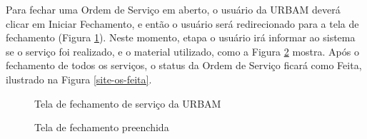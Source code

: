 \documentclass[
	article,			%
	11pt,				%
	oneside,			%
	a4paper,			%
	english,			%
	brazil,				%
	sumario=tradicional
	]{abntex2}
\begin{document}
\clearpage

Para fechar uma Ordem de Serviço em aberto, o usuário da URBAM deverá clicar em Iniciar Fechamento, e então o usuário será redirecionado para a tela de fechamento (Figura \ref{site-fechamento-urbam}).
Neste momento, etapa o usuário irá informar ao sistema se o serviço foi realizado, e o material utilizado, como a Figura \ref{site-material-e-motivo} mostra.
Após o fechamento de todos os serviços, o status da Ordem de Serviço ficará como Feita, ilustrado na Figura \ref{site-os-feita}.

\begin{figure}[!htbp]
 \centering
 \caption{\label{site-fechamento-urbam}Tela de fechamento de serviço da URBAM}
\end{figure}

\begin{figure}[!htbp]
 \centering
 \caption{\label{site-material-e-motivo}Tela de fechamento preenchida}
\end{figure}
\end{document}
